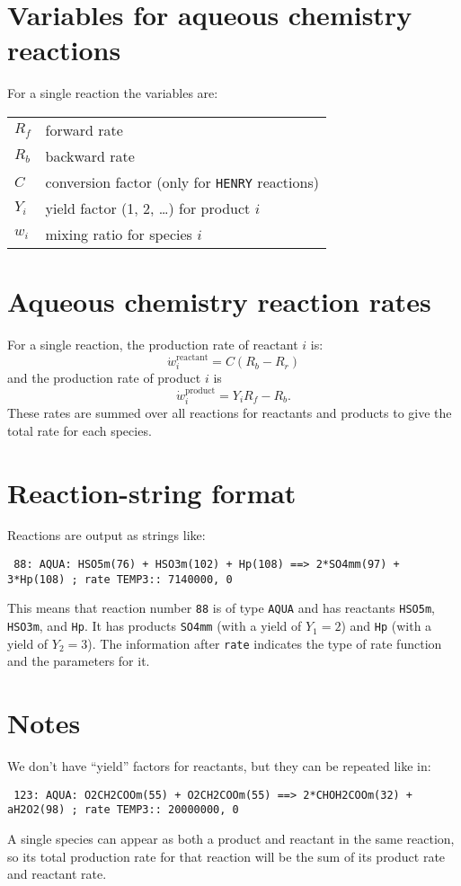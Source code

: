 \documentclass{article}
\begin{document}
\section{Variables for aqueous chemistry reactions}

For a single reaction the variables are:

\begin{tabular}{ll}
  $R_f$ & forward rate \\
  $R_b$ & backward rate \\
  $C$ & conversion factor (only for \texttt{HENRY} reactions) \\
  $Y_i$ & yield factor (1, 2, \ldots) for product $i$ \\
  $w_i$ & mixing ratio for species $i$
\end{tabular}

\section{Aqueous chemistry reaction rates}

For a single reaction, the production rate of reactant $i$ is:
\begin{equation}
  \dot{w}_i^{\text{reactant}} = C(R_b - R_r)
\end{equation}
and the production rate of product $i$ is
\begin{equation}
  \dot{w}_i^{\text{product}} = Y_i R_f - R_b.
\end{equation}
These rates are summed over all reactions for reactants and products
to give the total rate for each species.

\section{Reaction-string format}

Reactions are output as strings like:
\begin{verbatim}
 88: AQUA: HSO5m(76) + HSO3m(102) + Hp(108) ==> 2*SO4mm(97) + 3*Hp(108) ; rate TEMP3:: 7140000, 0
\end{verbatim}
This means that reaction number \texttt{88} is of type \texttt{AQUA}
and has reactants \texttt{HSO5m}, \texttt{HSO3m}, and \texttt{Hp}. It
has products \texttt{SO4mm} (with a yield of $Y_1 = 2$) and \texttt{Hp}
(with a yield of $Y_2 = 3$). The information after \texttt{rate}
indicates the type of rate function and the parameters for it.

\section{Notes}

We don't have ``yield'' factors for reactants, but they can be
repeated like in:
\begin{verbatim}
 123: AQUA: O2CH2COOm(55) + O2CH2COOm(55) ==> 2*CHOH2COOm(32) + aH2O2(98) ; rate TEMP3:: 20000000, 0
\end{verbatim}

A single species can appear as both a product and reactant in the same
reaction, so its total production rate for that reaction will be the
sum of its product rate and reactant rate.
\end{document}
